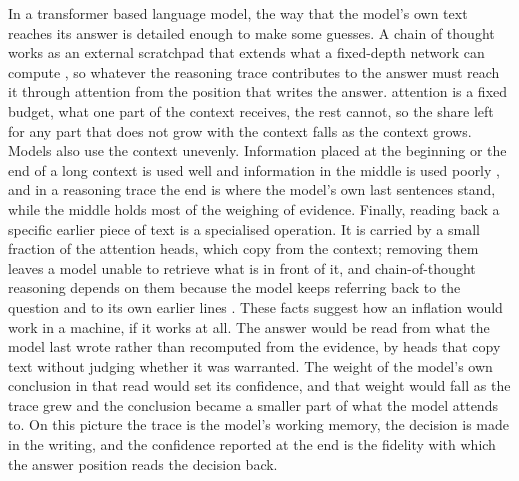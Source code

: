 \documentclass[11pt]{article}
\begin{document}
In a transformer based language model, the way that the model's own text reaches its answer is detailed enough to make some guesses. A chain of thought works as an external scratchpad that extends what a fixed-depth network can compute \citep{nye2021show,wei2022chain,li2024chain,merrill2024expressive}, so whatever the reasoning trace contributes to the answer must reach it through attention from the position that writes the answer. attention is a fixed budget, what one part of the context receives, the rest cannot, so the share left for any part that does not grow with the context falls as the context grows. Models also use the context unevenly. Information placed at the beginning or the end of a long context is used well and information in the middle is used poorly \citep{liu2024lost}, and in a reasoning trace the end is where the model's own last sentences stand, while the middle holds most of the weighing of evidence. Finally, reading back a specific earlier piece of text is a specialised operation. It is carried by a small fraction of the attention heads, which copy from the context; removing them leaves a model unable to retrieve what is in front of it, and chain-of-thought reasoning depends on them because the model keeps referring back to the question and to its own earlier lines \citep{wu2025retrieval}. These facts suggest how an inflation would work in a machine, if it works at all. The answer would be read from what the model last wrote rather than recomputed from the evidence, by heads that copy text without judging whether it was warranted. The weight of the model's own conclusion in that read would set its confidence, and that weight would fall as the trace grew and the conclusion became a smaller part of what the model attends to. On this picture the trace is the model's working memory, the decision is made in the writing, and the confidence reported at the end is the fidelity with which the answer position reads the decision back.
\end{document}
